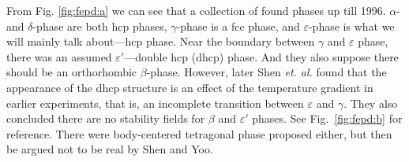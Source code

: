 From Fig. \ref{fig:fepd:a} we can see that a collection of found phases up
till 1996.
$\alpha$- and $\delta$-phase are both hcp phases, $\gamma$-phase
is a fcc phase, and $\varepsilon$-phase is what we will mainly
talk about---hcp phase.
Near the boundary between $\gamma$ and $\varepsilon$ phase,
there was an assumed $\varepsilon'$---double hcp (dhcp) phase.
And they also suppose there should be an orthorhombic $\beta$-phase.
However, later Shen \textit{et. al.}\cite{Shen:1998bt} found that the appearance of the
dhcp structure is an effect of the temperature gradient in earlier experiments,
that is, an incomplete transition between $\varepsilon$ and $\gamma$.
They also concluded there are no stability fields for $\beta$ and $\varepsilon'$ phases.
See Fig.~\ref{fig:fepd:b} for reference.
There were body-centered tetragonal phase proposed either, but then be argued not
to be real by Shen\cite{Shen:1998bt} and Yoo\cite{Yoo:1995kx}.








